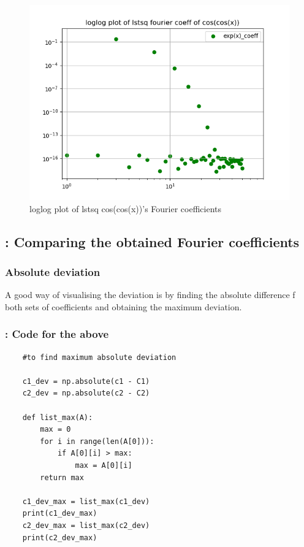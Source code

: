 \documentclass[11pt]{article}
\begin{document}
\begin{figure}[H]
    \centering
    \includegraphics[scale = 0.5]{Figure_10.png}
    \caption{loglog plot of lstsq cos(cos(x))'s Fourier coefficients}
\end{figure}

\subsection{: Comparing the obtained Fourier coefficients}
\subsubsection{Absolute deviation}
A good way of visualising the deviation is by finding the absolute difference f both sets of coefficients and obtaining the maximum deviation.
\subsubsection{: Code for the above}
\begin{verbatim}
    #to find maximum absolute deviation

    c1_dev = np.absolute(c1 - C1)
    c2_dev = np.absolute(c2 - C2)
    
    def list_max(A):
    	max = 0
    	for i in range(len(A[0])):
    		if A[0][i] > max:
    			max = A[0][i]
    	return max
    
    c1_dev_max = list_max(c1_dev)
    print(c1_dev_max)
    c2_dev_max = list_max(c2_dev)
    print(c2_dev_max)

\end{verbatim}
\end{document}
